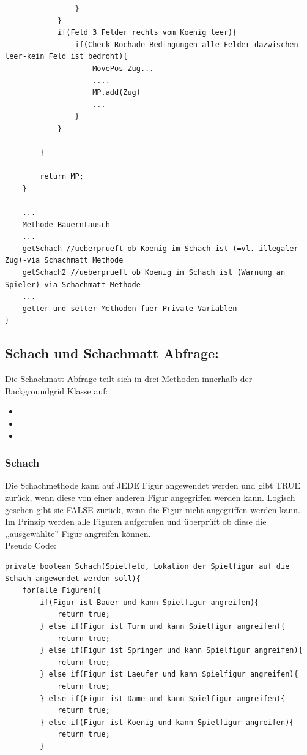 \documentclass[12pt,a4paper]{article}
\begin{document}
{\begin{lstlisting}
				}
			}
			if(Feld 3 Felder rechts vom Koenig leer){
				if(Check Rochade Bedingungen-alle Felder dazwischen leer-kein Feld ist bedroht){
					MovePos Zug...
					....
					MP.add(Zug)
					...
				}
			}
		
		}
		
		return MP;
	}
	
	...
	Methode Bauerntausch
	...
	getSchach //ueberprueft ob Koenig im Schach ist (=vl. illegaler Zug)-via Schachmatt Methode
	getSchach2 //ueberprueft ob Koenig im Schach ist (Warnung an Spieler)-via Schachmatt Methode
	...
	getter und setter Methoden fuer Private Variablen
}
\end{lstlisting}

\subsection{Schach und Schachmatt Abfrage:}
\label{SUBSEC:checkmate}

Die Schachmatt Abfrage teilt sich in drei Methoden innerhalb der Backgroundgrid Klasse auf:
\begin{itemize}
	\item{}
	\item{}
	\item{}
\end{itemize}



\subsubsection{Schach}
\label{SUBSUBSEC:check}

Die Schachmethode kann auf JEDE Figur angewendet werden und gibt TRUE zurück, wenn diese von einer anderen Figur angegriffen werden kann. Logisch gesehen gibt sie FALSE zurück, wenn die Figur nicht angegriffen werden kann. \\
Im Prinzip werden alle Figuren aufgerufen und überprüft ob diese die ,,ausgewählte'' Figur angreifen können. \\
Pseudo Code:

\lstset{language=Java}
\begin{lstlisting}
private boolean Schach(Spielfeld, Lokation der Spielfigur auf die Schach angewendet werden soll){
	for(alle Figuren){
		if(Figur ist Bauer und kann Spielfigur angreifen){
			return true;		
		} else if(Figur ist Turm und kann Spielfigur angreifen){
			return true;
		} else if(Figur ist Springer und kann Spielfigur angreifen){
			return true;
		} else if(Figur ist Laeufer und kann Spielfigur angreifen){
			return true;
		} else if(Figur ist Dame und kann Spielfigur angreifen){
			return true;
		} else if(Figur ist Koenig und kann Spielfigur angreifen){
			return true;
		}
		

\end{lstlisting}}
\end{document}
